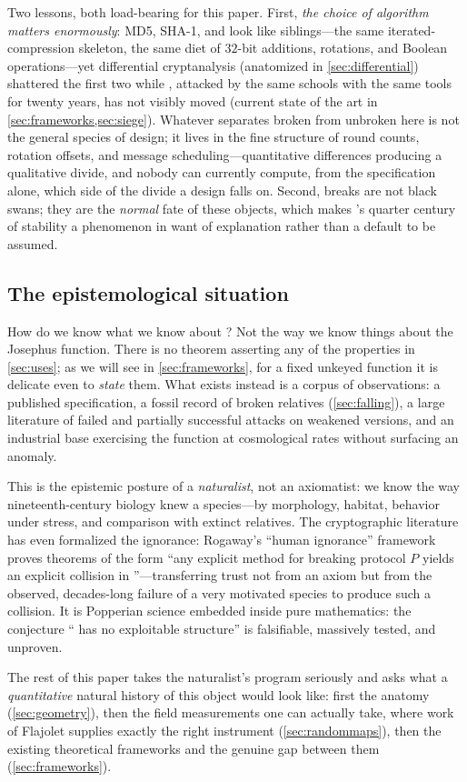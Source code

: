 Two lessons, both load-bearing for this paper. First, \emph{the choice of
algorithm matters enormously}: MD5, SHA-1, and \SHA{} look like
siblings---the same iterated-compression skeleton, the same diet of
$32$-bit additions, rotations, and Boolean operations---yet differential
cryptanalysis (anatomized in \cref{sec:differential}) shattered the first
two while \SHA{}, attacked by the same schools with the same tools for
twenty years, has not visibly moved
(current state of the art in \cref{sec:frameworks,sec:siege}). Whatever separates
broken from unbroken here is not the general species of design; it lives
in the fine structure of round counts, rotation offsets, and message
scheduling---quantitative differences producing a qualitative divide, and
nobody can currently compute, from the specification alone, which side of
the divide a design falls on. Second, breaks are not black swans; they are
the \emph{normal} fate of these objects, which makes \SHA{}'s quarter
century of stability a phenomenon in want of explanation rather than a
default to be assumed.

\subsection{The epistemological situation}\label{sec:epistemology}

How do we know what we know about \SHA{}? Not the way we know things about
the Josephus function. There is no theorem asserting any of the properties
in \cref{sec:uses}; as we will see in \cref{sec:frameworks}, for a fixed
unkeyed function it is delicate even to \emph{state} them. What exists
instead is a corpus of observations: a published specification, a fossil
record of broken relatives (\cref{sec:falling}), a large literature of
failed and partially successful attacks on weakened versions, and an
industrial base exercising the function at cosmological rates without
surfacing an anomaly.

This is the epistemic posture of a \emph{naturalist}, not an axiomatist:
we know \SHA{} the way nineteenth-century biology knew a species---by
morphology, habitat, behavior under stress, and comparison with extinct
relatives. The cryptographic literature has even formalized the ignorance:
Rogaway's ``human ignorance'' framework~\citep{Rogaway2006} proves
theorems of the form ``any explicit method for breaking protocol $P$
yields an explicit collision in \SHA{}''---transferring trust not from an
axiom but from the observed, decades-long failure of a very motivated
species to produce such a collision. It is Popperian science embedded
inside pure mathematics: the conjecture ``\SHA{} has no exploitable
structure'' is falsifiable, massively tested, and unproven.

The rest of this paper takes the naturalist's program seriously and asks
what a \emph{quantitative} natural history of this object would look like:
first the anatomy (\cref{sec:geometry}), then the field measurements one
can actually take, where work of Flajolet supplies exactly the right
instrument (\cref{sec:randommaps}), then the existing theoretical
frameworks and the genuine gap between them (\cref{sec:frameworks}).
